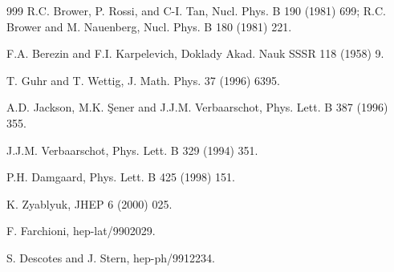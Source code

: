 \begin{thebibliography}{999}
      R.C. Brower, P. Rossi, and  C-I. Tan,
                      Nucl. Phys. B 190 (1981) 699;        %
                      R.C. Brower and M. Nauenberg,
                      Nucl. Phys. B 180 (1981) 221.        %

     F.A. Berezin and F.I. Karpelevich, 
                      Doklady Akad. Nauk SSSR 118 (1958) 9.   %

        T. Guhr and T. Wettig,
                      J. Math. Phys. 37 (1996) 6395.          %

      A.D. Jackson, M.K. \c Sener and J.J.M. Verbaarschot, 
                      Phys. Lett. B 387 (1996) 355.           %

        J.J.M. Verbaarschot, 
                      Phys. Lett. B 329 (1994) 351.           %

      P.H. Damgaard,
                      Phys. Lett. B 425 (1998) 151.           %

        K. Zyablyuk,
                      JHEP 6 (2000) 025.

     F. Farchioni,
                      hep-lat/9902029.                          %

      S. Descotes and J. Stern,
                      hep-ph/9912234.


\end{thebibliography}
